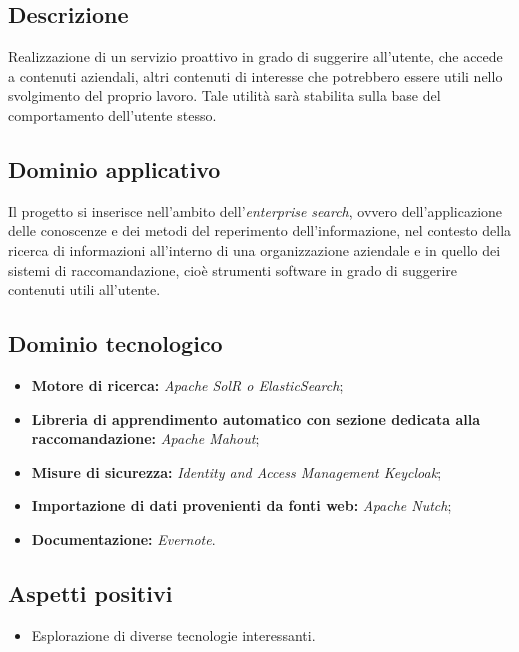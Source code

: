 \documentclass[openany,12pt,a4paper]{report}
\begin{document}
	\subsection{Descrizione}

	Realizzazione di un servizio proattivo in grado di suggerire all’utente, che accede a contenuti aziendali, altri contenuti di interesse che potrebbero essere utili nello svolgimento del proprio lavoro. Tale utilità sarà stabilita sulla base del comportamento dell’utente stesso.

	\subsection{Dominio applicativo}

	Il progetto si inserisce nell'ambito dell'\textit{enterprise search}, ovvero dell’applicazione delle conoscenze e dei metodi del reperimento dell’informazione, nel contesto della ricerca di informazioni all’interno di una organizzazione aziendale e in quello dei sistemi di raccomandazione, cioè strumenti software in grado di suggerire contenuti utili all’utente.

	\subsection{Dominio tecnologico}

	\begin{itemize}
		\item \textbf{Motore di ricerca:} \textit{Apache SolR o ElasticSearch};

		\item \textbf{Libreria di apprendimento automatico con sezione dedicata alla raccomandazione:} \textit{Apache Mahout};

		\item \textbf{Misure di sicurezza:} \textit{Identity and Access Management Keycloak};

		\item \textbf{Importazione di dati provenienti da fonti web:} \textit{Apache Nutch};

		\item \textbf{Documentazione:} \textit{Evernote}.
	\end{itemize}

	\subsection{Aspetti positivi}

	\begin{itemize}

		\item Esplorazione di diverse tecnologie interessanti.
	\end{itemize}
\end{document}
